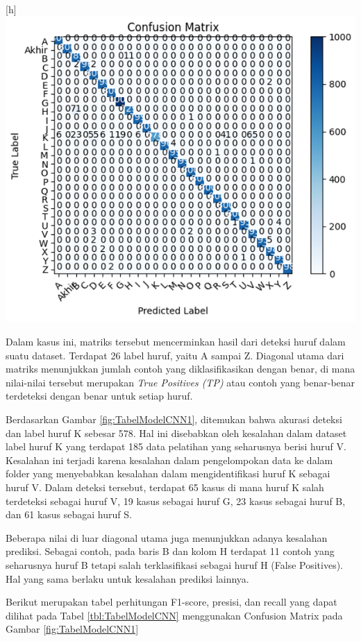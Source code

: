 \begin{center}[h]
	\includegraphics[width=0.7\linewidth]{gambar/bener/ConfusionMatrix_ModelCNN.png}
	\label{fig:TabelModelCNN1}
\end{center}
Dalam kasus ini, matriks tersebut mencerminkan hasil dari deteksi huruf dalam suatu dataset. Terdapat 26 label huruf, yaitu A sampai Z. Diagonal utama dari matriks menunjukkan jumlah contoh yang diklasifikasikan dengan benar, di mana nilai-nilai tersebut merupakan \textit{True Positives (TP)} atau contoh yang benar-benar terdeteksi dengan benar untuk setiap huruf.

Berdasarkan Gambar \ref{fig:TabelModelCNN1}, ditemukan bahwa akurasi deteksi dan label huruf K sebesar 578. Hal ini disebabkan oleh kesalahan dalam dataset label huruf K yang terdapat 185 data pelatihan yang seharusnya berisi huruf V. Kesalahan ini terjadi karena kesalahan dalam pengelompokan data ke dalam folder yang menyebabkan kesalahan dalam mengidentifikasi huruf K sebagai huruf V. Dalam deteksi tersebut, terdapat 65 kasus di mana huruf K salah terdeteksi sebagai huruf V, 19 kasus sebagai huruf G, 23 kasus sebagai huruf B, dan 61 kasus sebagai huruf S.

Beberapa nilai di luar diagonal utama juga menunjukkan adanya kesalahan prediksi. Sebagai contoh, pada baris B dan kolom H terdapat 11 contoh yang seharusnya huruf B tetapi salah terklasifikasi sebagai huruf H (False Positives). Hal yang sama berlaku untuk kesalahan prediksi lainnya.

Berikut merupakan tabel perhitungan F1-score, presisi, dan recall yang dapat dilihat pada Tabel \ref{tbl:TabelModelCNN} menggunakan Confusion Matrix pada Gambar \ref{fig:TabelModelCNN1}

